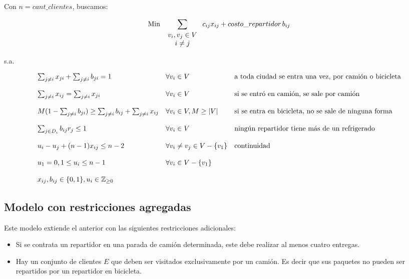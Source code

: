 \documentclass[10pt,a4paper]{article}
\begin{document}
	Con $n = cant\_clientes$, buscamos:

	\[
		\text{Min } \sum_{ \begin{tabular}{c}
				$v_i, v_j \in V$ \\
				$ i \neq j$
		\end{tabular}
		} c_{ij} x_{ij} + costo\_repartidor\,b_{ij}
	\]

	s.a.

	\[
	\begin{array}{l l l}
		\sum_{j \neq i} x_{ji} + \sum_{j \neq i} b_{ji} = 1 & \forall v_i \in V & \text{a toda ciudad se entra una vez, por camión o bicicleta} \\
		\\
		\sum_{j \neq i} x_{ij} = \sum_{j\neq i} x_{ji} & \forall v_i \in V & \text{si se entró en camión, se sale por camión} \\
		\\
		M(1 - \sum_{j \neq i} b_{ji}) \geq \sum_{j \neq i} b_{ij} + \sum_{j \neq i} x_{ij} & \forall v_i \in V, M \geq |V| & \text{si se entra en bicicleta, no se sale de ninguna forma} \\
		\\
		\sum_{j \in D_i} b_{ij} r_j \leq 1 & \forall v_i \in V & \text{ningún repartidor tiene más de un refrigerado} \\
		\\
		u_i - u_j + (n - 1) x_{ij} \leq n - 2 & \forall v_i \neq v_j \in V - \{v_1\} & \text{continuidad} \\
		\\
		u_1 = 0, 1 \leq u_i \leq n-1 & \forall v_i \in V - \{v_1\} \\
		\\
		x_{ij}, b_{ij} \in \{0,1\}, u_i \in \mathbb{Z}_{\geq 0}
	\end{array}
	\]
	
	\subsection{Modelo con restricciones agregadas}
	Este modelo extiende el anterior con las siguientes restricciones adicionales:
	\begin{itemize}
		\item Si se contrata un repartidor en una parada de camión determinada, este debe realizar al menos cuatro entregas.
		\item Hay un conjunto de clientes $E$ que deben ser visitados exclusivamente por un camión. Es decir que sus paquetes no pueden ser repartidos por un repartidor en bicicleta.
	\end{itemize}
	
\end{document}
